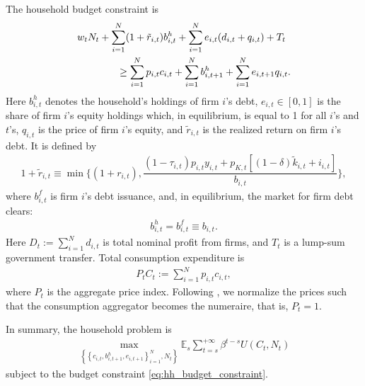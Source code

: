 \documentclass[12pt]{article}
\numberwithin{equation}{section}
\begin{document}
The household budget constraint is
\begin{align}\label{eq:hh_budget_constraint}
    &w_tN_t
    +\sum_{i=1}^{N}
        (1+\tilde{r}_{i,t})b^h_{i,t}
    +\sum_{i=1}^N e_{i,t} (d_{i,t} + q_{i,t}) + T_t \notag\\
    &\qquad \qquad\geq
    \sum_{i=1}^{N}
        p_{i,t}c_{i,t}
    +\sum_{i=1}^{N}b^h_{i,t+1} +\sum_{i=1}^N e_{i,t+1}  q_{i,t}.
\end{align}
Here $b^h_{i,t}$ denotes the household's holdings of firm $i$'s debt, $e_{i,t} \in [0,1]$ is the share of firm $i$'s equity holdings which, in equilibrium, is equal to 1 for all $i$'s and $t$'s, $q_{i,t}$ is the price of firm $i$'s equity, and $\tilde{r}_{i,t}$ is the realized return on firm $i$'s debt. It is defined by
\begin{align}\label{eq:hh_realized_return}
    1+\tilde{r}_{i,t} \equiv
    \min\Bigg\{
        (1+r_{i,t}),
        \dfrac{(1-\tau_{i,t})p_{i,t} y_{i,t}
        +
        p_{K,t}
        \left[
            (1-\delta)\tilde{k}_{i,t}+i_{i,t}
        \right]}{b_{i,t}}
    \Bigg\},
\end{align}
where $b^f_{i,t}$ is firm $i$'s debt issuance, and, in equilibrium, the market for firm debt clears:
\begin{align}\label{eq:firm_debt_market_clearing}
    b^h_{i,t}=b^f_{i,t} \equiv b_{i,t}.
\end{align}
Here $D_t:= \sum_{i=1}^N d_{i,t}$ is total nominal profit from firms, and $T_t$ is a lump-sum government transfer. Total consumption expenditure is
\begin{align*}
    P_tC_t
    :=
    \sum_{i=1}^{N}
        p_{i,t}c_{i,t},
\end{align*}
where $P_t$ is the aggregate price index. Following \cite{herskovicNetworksProductionAsset2018}, we normalize the prices such that the consumption aggregator becomes the numeraire, that is, $P_t=1$.

In summary, the household problem is
\begin{align}\label{eq:hh_problem}
    \max_{\left\{\left\{c_{i,t}, b^h_{i,t+1}, e_{i,t+1}\right\}_{i=1}^{N}, N_t\right\}} \mathbb{E}_s \sum_{t=s}^{+\infty} \beta^{t-s} U(C_t, N_t)
\end{align}
subject to the budget constraint \eqref{eq:hh_budget_constraint}.
\end{document}
